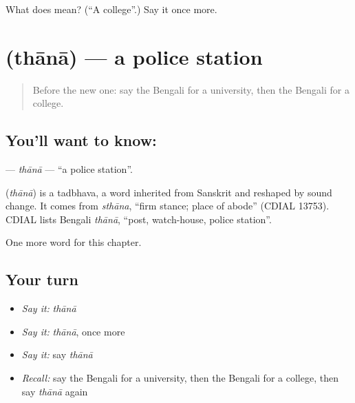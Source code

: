 \begin{tcolorbox}[breakable,colback=teal!4,colframe=teal!35!black,title={Before you move on}]
What does  mean? (\textquotedblleft{}A college\textquotedblright{}.) Say it once more.
\end{tcolorbox}
\section[\texorpdfstring{\bn{থানা} (thānā)}{থানা (thānā)}]{ (thānā) — a police station}

\label{lesson:BN-C188-thana}



\begin{quote}
Before the new one: say the Bengali for a university, then the Bengali for a college.
\end{quote}

\subsection*{You'll want to know: }
\textbf{} — \emph{thānā} — \textquotedblleft{}a police station\textquotedblright{}.

\begin{cousinweb}
\textbf{} (\emph{thānā}) is a tadbhava, a word inherited from Sanskrit and reshaped by sound change. It comes from \emph{sthāna}, \textquotedblleft{}firm stance; place of abode\textquotedblright{} (CDIAL 13753). CDIAL lists Bengali \emph{thānā}, \textquotedblleft{}post, watch-house, police station\textquotedblright{}.
\end{cousinweb}

\begin{grammarlens}[title={What you've built}]
One more word for this chapter.
\end{grammarlens}

\subsection*{Your turn}
\begin{itemize}
\raggedright
  \item \emph{Say it:} \emph{thānā}
  \item \emph{Say it:} \emph{thānā}, once more
  \item \emph{Say it:} say \emph{thānā}
  \item \emph{Recall:} say the Bengali for a university, then the Bengali for a college, then say \emph{thānā} again
\end{itemize}

